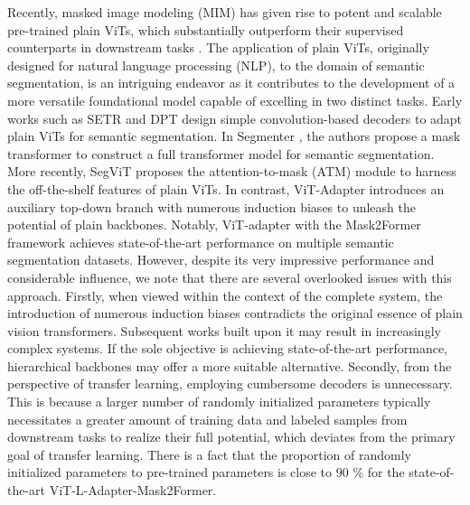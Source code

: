 \documentclass{article} \usepackage{iclr2024_conference,times}
\begin{document}
Recently, masked image modeling (MIM) has given rise to potent and scalable pre-trained plain ViTs, which substantially outperform their supervised counterparts in downstream tasks \citep{he2022masked,bao2022beit,zhou2022image,peng2022beit}. The application of plain ViTs, originally designed for natural language processing (NLP), to the domain of semantic segmentation, is an intriguing endeavor as it contributes to the development of a more versatile foundational model capable of excelling in two distinct tasks. Early works such as SETR \citep{zheng2021rethinking} and DPT \citep{ranftl2021vision} design simple convolution-based decoders to adapt plain ViTs for semantic segmentation. In Segmenter \citep{strudel2021segmenter}, the authors propose a mask transformer to construct a full transformer model for semantic segmentation. More recently, SegViT \citep{zhang2022segvit} proposes the attention-to-mask (ATM) module to harness the off-the-shelf features of plain ViTs. In contrast, ViT-Adapter \citep{chen2023vision} introduces an auxiliary top-down branch with numerous induction biases to unleash the potential of plain backbones. Notably, ViT-adapter with the Mask2Former \citep{cheng2022masked} framework achieves state-of-the-art performance on multiple semantic segmentation datasets. However, despite its very impressive performance and considerable influence, we note that there are several overlooked issues with this approach. Firstly, when viewed within the context of the complete system, the introduction of numerous induction biases contradicts the original essence of plain vision transformers. Subsequent works built upon it may result in increasingly complex systems. If the sole objective is achieving state-of-the-art performance, hierarchical backbones \citep{wang2022internimage} may offer a more suitable alternative. Secondly, from the perspective of transfer learning, employing cumbersome decoders is unnecessary. This is because a larger number of randomly initialized parameters typically necessitates a greater amount of training data and labeled samples from downstream tasks to realize their full potential, which deviates from the primary goal of transfer learning. There is a fact that the proportion of randomly initialized parameters to pre-trained parameters is close to 90 $\%$ for the state-of-the-art ViT-L-Adapter-Mask2Former.
\end{document}
